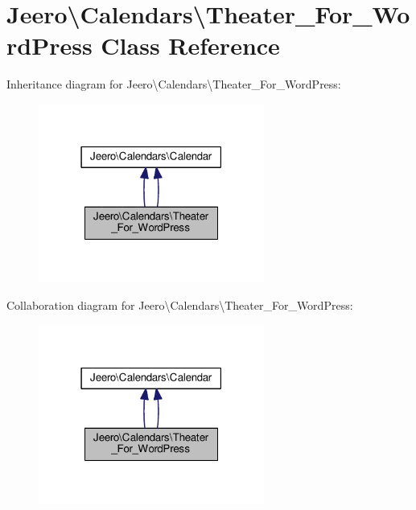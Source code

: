 \hypertarget{classJeero_1_1Calendars_1_1Theater__For__WordPress}{}\section{Jeero\textbackslash{}Calendars\textbackslash{}Theater\+\_\+\+For\+\_\+\+Word\+Press Class Reference}
\label{classJeero_1_1Calendars_1_1Theater__For__WordPress}


Inheritance diagram for Jeero\textbackslash{}Calendars\textbackslash{}Theater\+\_\+\+For\+\_\+\+Word\+Press\+:\nopagebreak
\begin{figure}[H]
\begin{center}
\leavevmode
\includegraphics[width=210pt]{classJeero_1_1Calendars_1_1Theater__For__WordPress__inherit__graph}
\end{center}
\end{figure}


Collaboration diagram for Jeero\textbackslash{}Calendars\textbackslash{}Theater\+\_\+\+For\+\_\+\+Word\+Press\+:\nopagebreak
\begin{figure}[H]
\begin{center}
\leavevmode
\includegraphics[width=210pt]{classJeero_1_1Calendars_1_1Theater__For__WordPress__coll__graph}
\end{center}
\end{figure}


